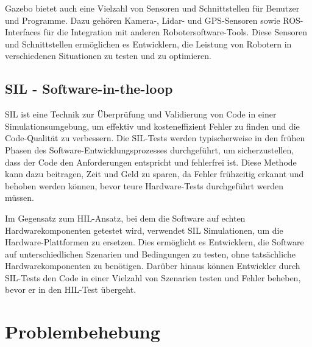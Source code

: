 Gazebo bietet auch eine Vielzahl von Sensoren und Schnittstellen für Benutzer und Programme. Dazu gehören Kamera-, Lidar- und GPS-Sensoren sowie ROS-Interfaces für die Integration mit anderen Robotersoftware-Tools. Diese Sensoren und Schnittstellen ermöglichen es Entwicklern, die Leistung von Robotern in verschiedenen Situationen zu testen und zu optimieren.
\cite[vgl.][]{gazebosim}

\subsection{SIL - Software-in-the-loop}

\ac{SIL} ist eine Technik zur Überprüfung und Validierung von Code in einer Simulationsumgebung, um effektiv und kosteneffizient Fehler zu finden und die Code-Qualität zu verbessern. Die SIL-Tests werden typischerweise in den frühen Phasen des Software-Entwicklungsprozesses durchgeführt, um sicherzustellen, dass der Code den Anforderungen entspricht und fehlerfrei ist. Diese Methode kann dazu beitragen, Zeit und Geld zu sparen, da Fehler frühzeitig erkannt und behoben werden können, bevor teure Hardware-Tests durchgeführt werden müssen.

Im Gegensatz zum \ac{HIL}-Ansatz, bei dem die Software auf echten Hardwarekomponenten getestet wird, verwendet \ac{SIL} Simulationen, um die Hardware-Plattformen zu ersetzen. Dies ermöglicht es Entwicklern, die Software auf unterschiedlichen Szenarien und Bedingungen zu testen, ohne tatsächliche Hardwarekomponenten zu benötigen. Darüber hinaus können Entwickler durch \ac{SIL}-Tests den Code in einer Vielzahl von Szenarien testen und Fehler beheben, bevor er in den \ac{HIL}-Test übergeht.


\section{Problembehebung} \label{problembehebung:section}
